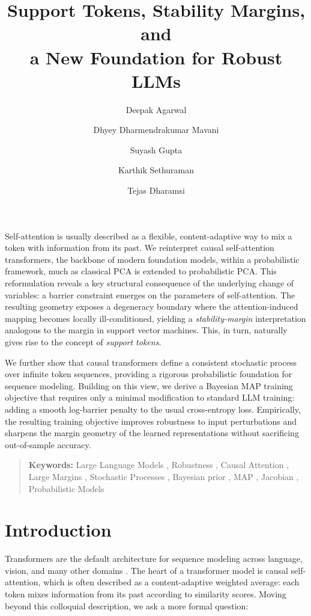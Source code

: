 \documentclass[11pt]{article}
\title{Support Tokens, Stability Margins, and \\ a New Foundation for Robust LLMs \vspace{1em}}
\author[1]{Deepak Agarwal}
\author[1]{Dhyey Dharmendrakumar Mavani}
\author[1]{Suyash Gupta}
\author[1]{Karthik Sethuraman}
\author[1]{Tejas Dharamsi}
\affil[1]{LinkedIn, Mountain View, CA \\ \protect\linebreak \texttt{\{dagarwal, dmavani, suyagupta, ksethuraman, tdharamsi\}@linkedin.com}}
\date{\vspace{-3em}}
\newcommand\Suyash[1]{{\color{blue}Suyash: ``#1''}}
\newcommand\Deepak[1]{{\color{orange}Deepak: ``#1''}}
\newcommand\Karthik[1]{{\color{red}Karthik: ``#1''}}
\newcommand\Dhyey[1]{{\color{violet}Dhyey: ``#1''}}
\newcommand\Tejas[1]{{\color{green}Tejas: ``#1''}}
\renewenvironment{abstract}{%
    \vspace{0.25em}
    \begin{center}%
        {\bfseries \abstractname \vspace{-0.5em}}%
    \end{center}%
    \quotation \small
}{%
    \endquotation
}
\renewcommand{\keywords}[1]{%
    \begin{quote}
    \small \textbf{Keywords:} 
    \def\and{\unskip, } 
    #1
    \end{quote}
}
\begin{document}
\newcommand{\paperVersion}{arxiv}  %

\maketitle

\begin{abstract}
Self-attention is usually described as a flexible, content-adaptive way to mix a token with information from its past. We reinterpret causal self-attention transformers, the backbone of modern foundation models, within a probabilistic framework, much as classical PCA is extended to probabilistic PCA. This reformulation reveals a key structural consequence of the underlying change of variables: a barrier constraint emerges on the parameters of self-attention. The resulting geometry exposes a degeneracy boundary where the attention-induced mapping becomes locally ill-conditioned, yielding a \emph{stability-margin} interpretation analogous to the margin in support vector machines. This, in turn, naturally gives rise to the concept of \emph{support tokens}.

We further show that causal transformers define a consistent stochastic process over infinite token sequences, providing a rigorous probabilistic foundation for sequence modeling. Building on this view, we derive a Bayesian MAP training objective that requires only a minimal modification to standard LLM training: adding a smooth log-barrier penalty to the usual cross-entropy loss. Empirically, the resulting training objective improves robustness to input perturbations and sharpens the margin geometry of the learned representations without sacrificing out-of-sample accuracy.

\end{abstract}

\keywords{Large Language Models \and Robustness \and Causal Attention \and Large Margins \and Stochastic Processes \and Bayesian prior \and MAP \and Jacobian \and Probabilistic Models}


\section{Introduction}
\label{sec:introduction}

Transformers are the default architecture for sequence modeling across language, vision, and many other domains \citep{VaswaniShPaUsJoGoKaPo17,BrownMaRyEtAl20,DosovitskiyBeKoWeZhUnDe21}. The heart of a transformer model is causal self-attention, which is often described as a content-adaptive weighted average: each token mixes information from its past according to similarity scores. Moving beyond this colloquial description, we ask a more formal question:
\end{document}
